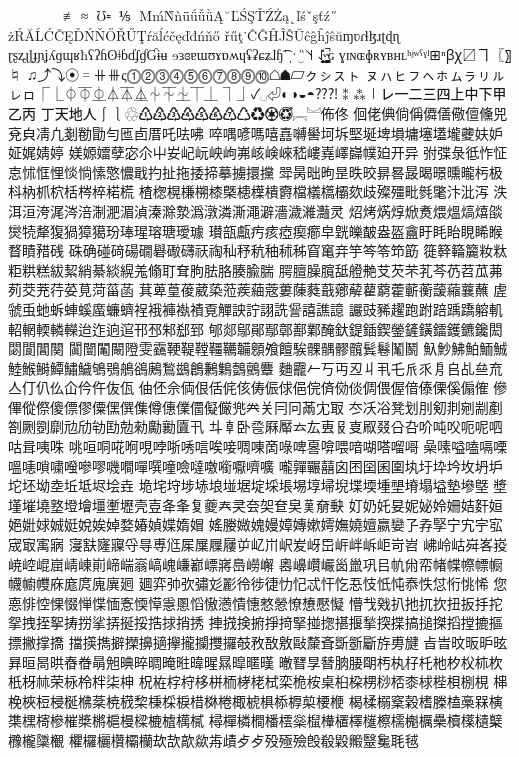 ⊄⊅⊊⊋∉⌅⌆∥∦≢≅≈≶≷℧⹀⋚⋛⅕⌘
ḾḿǸǹǖǘǚǜĄ˘ĽŚŞŤŹŻą˛ľśˇşťź˝
żŔĂĹĆČĘĎŃŇŐŘŰŢŕăĺćčęďđńňő
řűţ˙ĈĜĤĴŜŬĉĝĥĵŝŭɱʋɾɬɮɹʈɖɳ
ɽʂʐɻɭɟɲʝʎɡɰʁħʕʔɦʘǂɓɗʄɠƓɨʉ
ɘɜɞɐɯʊɤɒʍɥʢʡɕʑɺɧ͡ˈˌˑ‿̏˥˦˧
˨˩̥̬̹̜̟̠̩̯̽˞̴̤̰̼̝̞̘̙̪̺̻̚ɢ
ɣɪɴɶɸʀʏʙʜʟʰʲʷˁˠˡ⊞ⁿꞵꭓ〼ヿ〖〗♮
♫⤴⤵⦿゠⧺⧻ς⓵⓶⓷⓸⓹⓺⓻⓼⓽⓾☖☗▱ㇰㇱㇲㇳ
ㇴㇵㇶㇷㇸㇹㇺㇻㇼㇽㇾㇿ⎾⎿⏀⏁⏂⏃⏄⏅⏆⏇⏈⏉⏊
⏋⏌✓␣⏎◐◑◒◓⁇⁈⁑⁂㆐㆑㆒㆓㆔㆕㆖㆗㆘㆙㆚㆛
㆜㆝㆞㆟⎰⎱♲♳♴♵♶♷♸♹♺♻♼♽゙゚⃝︗︘佈佟
佪佬倎倘偁僲僐儆儃儵兕兗㒵凊凢剗勌勖勻匜卣厝吒呿咈
啐喁喭嗎嘻嚞嚩嚳坷坼𡌛埏埤塤墉𡑮壒壠虁妋妒姃娓婧婷
媄嫄𡢽孽宓尒屮𡚴屺岏岟岣岪峐𡸴崍嵇嶁嶤嶧巋幞廹开异
弣弽彔彽怍怔怘怵恇悝惔惝愫憼憹戢扚扯拖捼揥摹擄擐攩
斝昺昢昫昰昳晈𣇄晷晸暍暻曛曨杇极枓枘枛柼栝梣椊楉𣗄
楂楤榥槏㮶㯃槩槵𣜿樻𣝣檔檥㰏欛欬歧殩殭毗毿氅汴沘泻
泆洱洹洿浘涔涪淛淝湄湞溱滁漐潙潡潾澌澠澼濇濊濰灎灵
炤烤焫焞焮煑煨熅熇熺燄爕㸿犛𤟱猧獐獦玢琫瑆瑢瑭璦璩
瓉瓿甗㽲痎瘂瘈癤皁皝皪皶盎盔盦盱眊眙睍睎睺瞀瞔矠𥒎
硃确碰𥔎碭礀礜礮礴祆祹秈𥝱秔秞秫秭窅𥧄竎竽笒笭笻筯
簁簳𥶡籭籹粏粔粠糕紱絜綃綦緂縨羗翛耵耷胊胠胳腠腧腨
腭膻臊臗䑛艠艴𦫿芡芣芤芩芿苕苽茀茢茭茺荇荽莧菏菑菡
萁萆葟葰葳蒅蒞蒺𦹀蔲蔞蔯蕤蕺薌薢藋藭藿蘄蘅蘐𧃴蘘蘸
虗虢䖝虵蚸蛼螇䗪蠊蠐裎𧚄褲褹襀覔觶詇詝詡詵諐譆譙譩
讝豉豨趯跑跗踣踽蹻𨉷䡄軺輞輭轔𨏍迨迮逈逭邗邳邾郄郅
郇郯鄔鄖鄢鄣鄯鄴醃釱鍉鍤鍥鎣鏟鐄鐳鑊鑣鑱閎閟閬閶闋
闐闓䦰闞隥雯靎鞕鞮鞺韁韉韛顖飧饘騃髁髃髎髖鬂鬈䰗鬭
魞魦鮄鮊鮞鯎鯥鯸鰣鱏鱐鱥鴝鴞鵃鵒鶊鶖鷀鶬鶼𪆐鷧鸇麞
麯龗𠂉丂丏丒丩丮乇𠂢乑㐆𠂤乩亝㐬亼仃仈仫仚仱仵伖佤
伷伾佘𠈓佷佸侂侅俦侲俅俋俒㑪俲倓倜偎偓偣傣傈傒傓傕
傪𠌫傱傺傻僄僇僳𠎁僎𠍱僔僡㒒𠏹儗𠑊兠𠔉关冃冋㒼冘冣
冭㓇𠗖凳划刖𠝏剕剜剬剷劄劂𠠇劘𠠺劤劺劻勊勑𠢹勷匵卂
𠥼𠦝卧卺厤厴𠫓厷叀𠬝㕝㕞叕㕣叴吤吨㕮呃呢呬咕咠咦咮
咷咺哃𠵅哬哯哱哳唀唁唉唼啁㖦啇㖨啤𠷡啽喂喑㗅嗒𠺕𠹭
喿嗉嗌嗑嗝㗚嗢𠹤嗩嘨𠽟嘇嘐嘰㗴嘽噀噇噞噠噭㘅嚈嚌嚝
嚨嚲囅囍囟囨囶囷𡈁𡉕圩𡉻坅坆坍𡉴坨坯坳坴坵坻𡋤𡋗垚
垝垞垨埗𡋽埌𡌶𡍄埞埰㙊埸埻埽堄堞堧堹𡏄塉塌塧墊墋墍
墏墐墔墝墪墱𡑭壃壍壢壳壴夅夆复夔𡗗㚑夽㚙奆㚖𦰩奟𡙇
奵奶奼妟妮妼姈姍姞姧姮𡜆𡝂㛏娍娗娧娭婥婺媋媜媟媠媢
媱媵媺媿嫚嫜嫥嫰嫮嫵嬈嬗嬴孌孒孨孯宁宄𡧃宖宬㝡㝢寎
寖㝬㝫寱寽㝵尃尩𡱖屟屧屨屰𡴭𡵅𡵸𡵢岈岊㟁𡶡𡶜岠岢岧
𡶒岭岵𡶷峉𡷠𡸳崆崐崫崝崠崱崹㟨嵡嵪㟴嵰𡼞㟽嶈㠀嶗嶰
嶴𡽶巑巗𡿺巤巩㠯㠶㡀帟帾幉㡜幖㡡幭幮𢅻庥庬庹廆廙𢌞
廽弈𢎭弞彇彣彲彾徏徢忇忋忒忓忔忢忮忯忳㤗怢怤㤚恌悕
您𢛳悱悾惈惙惮惵愐愙愞愺㥯慁慆慠𢡛憒憓憗憥憭𢢫懕懝
懵𢦏戣扒扡扤扻扭扳抙拕𢪸拽挃挐𢭏𢭐挲挵挻挼捁捄捎𢭆
捙𢰝𢮦捬掙𢰤掔掽揔揕揠揫揬揲搞搥搩搯摚摝摳摽撇撑撟
擋擌擕擗𢷡擤擿㩮攏攔㩳攞攲敄敔敫敺斄斊斲斵斸斿旉旔
㫖旹旼昄昈昡昪晅晑晎㫪𣇃𣇵𣆶晪晬晭晻暀暐暒㬎暭暱暵
㬚㬜㫗朁朒𣍲朙𣏓𣏒杍杔杝𣏐𣏤𣏕杴𣏚枒𣏟荣栐柃柈柒柛
柷𣑊𣑑𣑋栘栟栭𣑥栳栻栾桅桉桌桕桗㭷桫桮桼梂梐梖㭭梘
梙梚梜梪梫梴梻棻𣓤𣕚棃棅棌棙棤棥棬棷椃椇㮇𣖔㮍楆楩
楬楺榒㮤榖榰榺榼槀槑𣘹𣙇𣘸槣槮槯槳㯍槴槾樑樚樝𣜜樲
樳樿橉橺橎橒橤𣜌檋㯰檡𣝤檫檽櫆櫔櫐櫝𣟿𣟧櫱櫲櫳櫽𣠤
欋欏欐欑𣠽欗㰦欯歊歘歬歵⺞歺殁殛殮𣪘殽毇毈毉毚毦毧
